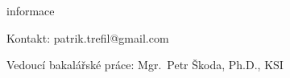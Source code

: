\documentclass[portrait,a0paper,fontscale=0.25]{baposter}
\begin{document}
\begin{poster}
        \begin{posterbox}[column=1, name=information, below=conclusion]{informace}
            \begin{minipage}[t]{\textwidth-3cm}
            \raggedright
            Kontakt:\newline
            patrik.trefil@gmail.com

            \vspace{3mm}

            Vedoucí bakalářské práce:\newline
            Mgr.\ Petr Škoda, Ph.D.,
            KSI
            \end{minipage}%
            \hfill%
            \begin{minipage}[t]{2.3cm}
                \raisebox{\dimexpr-\height+.7\baselineskip}{}
            \end{minipage}

        \end{posterbox}

    \end{poster}
\end{document}
